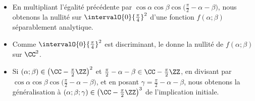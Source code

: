 \begin{example}
\begin{itemize}
    	\item En multipliant l'égalité précédente par 
		$\cos \alpha \cos \beta \cos \big( \frac{\pi}{2} - \alpha - \beta \big)$,
		nous obtenons la nullité sur $\intervalO{0}{\frac{\pi}{4}}^2$ d'une fonction $f(\alpha ; \beta)$ séparablement analytique.


    	\item Comme $\intervalO{0}{\frac{\pi}{4}}^2$ est discriminant, le  donne la nullité de $f(\alpha ; \beta)$ sur $\CC^2$.


    	\item Si
		$(\alpha ; \beta) \in \big( \CC - \frac{\pi}{2} \ZZ \big)^2$
		et
		$\frac{\pi}{2} - \alpha - \beta \in \CC - \frac{\pi}{2} \ZZ$,
		en divisant par
		$\cos \alpha \cos \beta \cos \big( \frac{\pi}{2} - \alpha - \beta \big)$,
		et
		en posant $\gamma = \frac{\pi}{2} - \alpha - \beta$,
		nous obtenons la généralisation à $(\alpha ; \beta ; \gamma) \in \big( \CC - \frac{\pi}{2} \ZZ \big)^3$ de l'implication initiale.
    \end{itemize}
\end{example}
